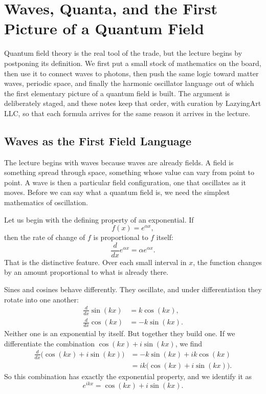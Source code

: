 \chapter{Waves, Quanta, and the First Picture of a Quantum Field}

Quantum field theory is the real tool of the trade, but the lecture begins by postponing its definition. We first put a small stock of mathematics on the board, then use it to connect waves to photons, then push the same logic toward matter waves, periodic space, and finally the harmonic oscillator language out of which the first elementary picture of a quantum field is built. The argument is deliberately staged, and these notes keep that order, with curation by LazyingArt LLC, so that each formula arrives for the same reason it arrives in the lecture.

\section{Waves as the First Field Language}

The lecture begins with waves because waves are already fields. A field is something spread through space, something whose value can vary from point to point. A wave is then a particular field configuration, one that oscillates as it moves. Before we can say what a quantum field is, we need the simplest mathematics of oscillation.

Let us begin with the defining property of an exponential. If
\[
f(x)=e^{\alpha x},
\]
then the rate of change of \(f\) is proportional to \(f\) itself:
\begin{equation}
\frac{d}{dx}e^{\alpha x}=\alpha e^{\alpha x}.
\end{equation}
That is the distinctive feature. Over each small interval in \(x\), the function changes by an amount proportional to what is already there.

Sines and cosines behave differently. They oscillate, and under differentiation they rotate into one another:
\begin{align}
\frac{d}{dx}\sin(kx)&=k\cos(kx),\\
\frac{d}{dx}\cos(kx)&=-k\sin(kx).
\end{align}
Neither one is an exponential by itself. But together they build one. If we differentiate the combination \(\cos(kx)+i\sin(kx)\), we find
\begin{align}
\frac{d}{dx}\bigl(\cos(kx)+i\sin(kx)\bigr)
&=-k\sin(kx)+ik\cos(kx)\\
&=ik\bigl(\cos(kx)+i\sin(kx)\bigr).
\end{align}
So this combination has exactly the exponential property, and we identify it as
\begin{equation}
e^{ikx}=\cos(kx)+i\sin(kx).
\end{equation}


